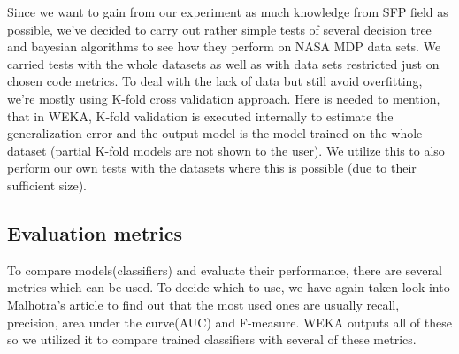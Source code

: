 Since we want to gain from our experiment as much knowledge from SFP field as possible, we've decided to carry out rather simple tests of several decision tree and bayesian algorithms to see how they perform on NASA MDP data sets. We carried tests with the whole datasets as well as with data sets restricted just on chosen code metrics. To deal with the lack of data but still avoid overfitting, we're mostly using K-fold cross validation approach. Here is needed to mention, that in WEKA, K-fold validation is executed internally to estimate the generalization error and the output model is the model trained on the whole dataset (partial K-fold models are not shown to the user). We utilize this to also perform our own tests with the datasets where this is possible (due to their sufficient size).

\subsection{Evaluation metrics}
To compare models(classifiers) and evaluate their performance, there are several metrics which can be used. To decide which to use, we have again taken look into Malhotra's article\cite{malhotra2015systematic} to find out that the most used ones are usually recall, precision, area under the curve(AUC) and F-measure. WEKA outputs all of these so we utilized it to compare trained classifiers with several of these metrics.